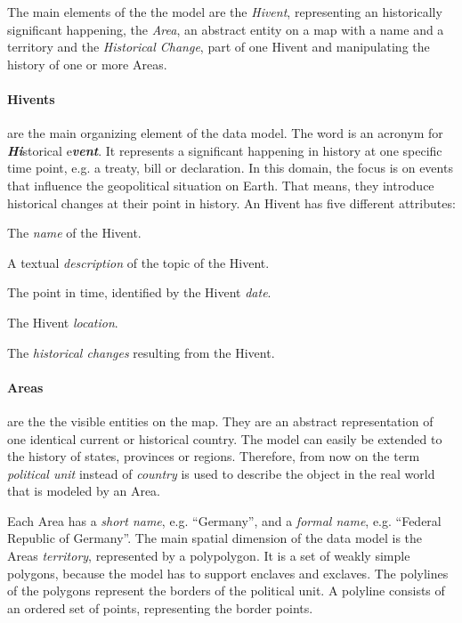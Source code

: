 The main elements of the the model are the \emph{Hivent}, representing an historically significant happening, the \emph{Area}, an abstract entity on a map with a name and a territory and the \emph{Historical Change}, part of one Hivent and manipulating the history of one or more Areas.

\paragraph{Hivents} %
\label{par:hivent}

are the main organizing element of the data model. The word is an acronym for \emph{\textbf{Hi}}storical e\emph{\textbf{vent}}. It represents a significant happening in history at one specific time point, e.g. a treaty, bill or declaration. In this domain, the focus is on events that influence the geopolitical situation on Earth. That means, they introduce historical changes at their point in history. An Hivent has five different attributes:

\begin{compactenum}
  \item The \emph{name} of the Hivent.
  \item A textual \emph{description} of the topic of the Hivent.
  \item The point in time, identified by the Hivent \emph{date}.
  \item The Hivent \emph{location}.
  \item The \emph{historical changes} resulting from the Hivent.
\end{compactenum}


\paragraph{Areas} %
\label{par:area}

are the the visible entities on the map. They are an abstract representation of one identical current or historical country. The model can easily be extended to the history of states, provinces or regions. Therefore, from now on the term \emph{political unit} instead of \emph{country} is used to describe the object in the real world that is modeled by an Area.

Each Area has a \emph{short name}, e.g. ``Germany'', and a \emph{formal name}, e.g. ``Federal Republic of Germany''. The main spatial dimension of the data model is the Areas \emph{territory}, represented by a polypolygon. It is a set of weakly simple polygons, because the model has to support enclaves and exclaves. The polylines of the polygons represent the borders of the political unit. A polyline consists of an ordered set of points, representing the border points.

